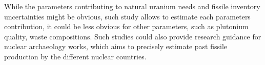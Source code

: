 \documentclass{anstrans}
\begin{document}
While the parameters contributing to natural uranium needs and fissile inventory
uncertainties might be obvious, such study allows to estimate each parameters
contribution, it could be less obvious for other parameters, such as
plutonium quality, waste compositions.  Such studies could also provide research
guidance for nuclear archaeology works, which aims to precisely estimate past
fissile production by the different nuclear countries.




\end{document}
